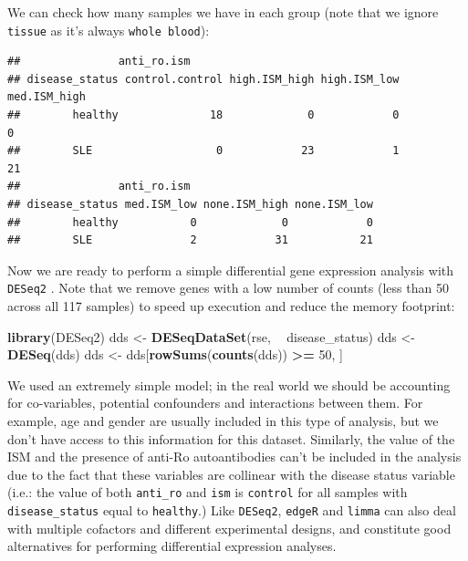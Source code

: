 \documentclass[9pt,a4paper,]{extarticle}
\newenvironment{Shaded}{\begin{snugshade}}{\end{snugshade}}
\newcommand{\KeywordTok}[1]{\textcolor[rgb]{0.13,0.29,0.53}{\textbf{#1}}}
\newcommand{\DataTypeTok}[1]{\textcolor[rgb]{0.13,0.29,0.53}{#1}}
\newcommand{\DecValTok}[1]{\textcolor[rgb]{0.00,0.00,0.81}{#1}}
\newcommand{\StringTok}[1]{\textcolor[rgb]{0.31,0.60,0.02}{#1}}
\newcommand{\OperatorTok}[1]{\textcolor[rgb]{0.81,0.36,0.00}{\textbf{#1}}}
\newcommand{\NormalTok}[1]{#1}
\theoremstyle{definition}
\theoremstyle{definition}
\theoremstyle{definition}
\theoremstyle{remark}
\begin{document}
We can check how many samples we have in each group (note that we ignore \texttt{tissue} as it's always \texttt{whole\ blood}):

\begin{Shaded}
\end{Shaded}

\begin{verbatim}
##               anti_ro.ism
## disease_status control.control high.ISM_high high.ISM_low med.ISM_high
##        healthy              18             0            0            0
##        SLE                   0            23            1           21
##               anti_ro.ism
## disease_status med.ISM_low none.ISM_high none.ISM_low
##        healthy           0             0            0
##        SLE               2            31           21
\end{verbatim}

Now we are ready to perform a simple differential gene expression analysis with \texttt{DESeq2} \citep{Love2014}.
Note that we remove genes with a low number of counts (less than 50 across all 117 samples) to speed up execution and reduce the memory footprint:

\begin{Shaded}
\begin{Highlighting}[]
\KeywordTok{library}\NormalTok{(DESeq2)}
\NormalTok{dds <-}\StringTok{ }\KeywordTok{DESeqDataSet}\NormalTok{(rse, }\OperatorTok{~}\StringTok{ }\NormalTok{disease_status)}
\NormalTok{dds <-}\StringTok{ }\KeywordTok{DESeq}\NormalTok{(dds)}
\NormalTok{dds <-}\StringTok{ }\NormalTok{dds[}\KeywordTok{rowSums}\NormalTok{(}\KeywordTok{counts}\NormalTok{(dds)) }\OperatorTok{>=}\StringTok{ }\DecValTok{50}\NormalTok{, ]}
\end{Highlighting}
\end{Shaded}

We used an extremely simple model; in the real world we should be accounting for co-variables, potential confounders and interactions between them.
For example, age and gender are usually included in this type of analysis, but we don't have access to this information for this dataset.
Similarly, the value of the ISM and the presence of anti-Ro autoantibodies can't be included in the analysis due to the fact that these variables are collinear with the disease status variable (i.e.: the value of both \texttt{anti\_ro} and \texttt{ism} is \texttt{control} for all samples with \texttt{disease\_status} equal to \texttt{healthy}.)
Like \texttt{DESeq2}, \texttt{edgeR} \citep{Robinson2010} and \texttt{limma} \citep{Ritchie2015} can also deal with multiple cofactors and different experimental designs, and constitute good alternatives for performing differential expression analyses.
\end{document}
